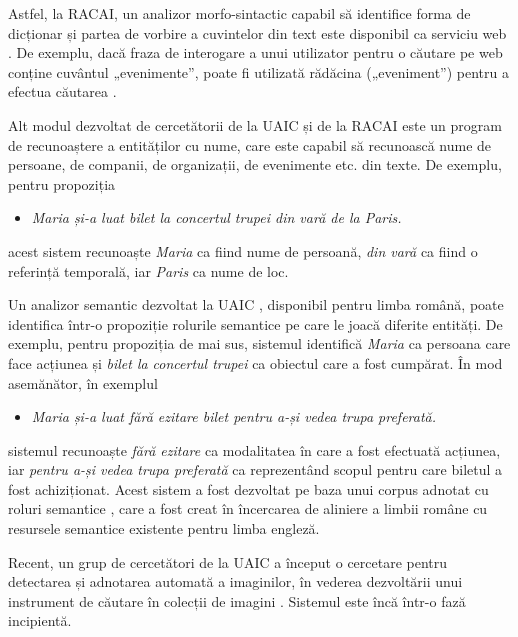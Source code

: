 \begin{multicols}{2}
Astfel, la RACAI, un analizor morfo-sintactic capabil să identifice forma de dicționar și partea de vorbire a cuvintelor din text este disponibil ca serviciu web \cite{webservicesUrl}. De exemplu, dacă fraza de interogare a unui utilizator pentru o căutare pe web conține cuvântul „evenimente”, poate fi utilizată rădăcina („eveniment”) pentru a efectua căutarea \cite{webservicesArt}.

Alt modul dezvoltat de cercetătorii de la UAIC și de la RACAI este un program de recunoaștere a entităților cu nume, care este capabil să recunoască nume de persoane, de companii, de organizații, de evenimente etc. din texte. De exemplu, pentru propoziția 

\begin{itemize}
\item\textit{Maria și-a luat bilet la concertul trupei din vară de la Paris.}
\end{itemize}

\noindent acest sistem recunoaște \textit{Maria} ca fiind nume de persoană, \textit{din vară} ca fiind o referință temporală, iar \textit{Paris} ca nume de loc.

Un analizor semantic dezvoltat la UAIC \cite{isda}, disponibil pentru limba română, poate identifica \mbox{într-o} propoziție rolurile semantice pe care le joacă diferite entități. De exemplu, pentru propoziția de mai sus, sistemul identifică \textit{Maria} ca persoana care face acțiunea și \textit{bilet la concertul trupei} ca obiectul care a fost cumpărat. În mod asemănător, în exemplul

\begin{itemize}
\item\textit{Maria și-a luat fără ezitare bilet pentru a-și vedea trupa preferată.}
\end{itemize}

\noindent
sistemul recunoaște \textit{fără ezitare} ca modalitatea în care a fost efectuată acțiunea, iar \textit{pentru a-și vedea trupa preferată} ca reprezentând scopul pentru care biletul a fost achiziționat. Acest sistem a fost dezvoltat pe baza unui corpus adnotat cu roluri semantice \cite{trandabat}, care a fost creat în încercarea de aliniere a limbii române cu resursele semantice existente pentru limba engleză.

Recent, un grup de cercetători de la UAIC a început o cercetare pentru detectarea și adnotarea automată a imaginilor, în vederea dezvoltării unui instrument de căutare în colecții de imagini \cite{iftene}. Sistemul este încă \mbox{într-o} fază incipientă.


\end{multicols}
